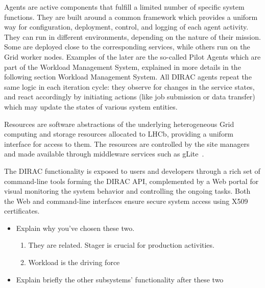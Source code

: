 \documentclass{IEEEtran}
\begin{document}
Agents are active components that fulfill a limited number of specific
system functions. They are built around a common framework which provides
a uniform way for configuration, deployment, control, and logging of each
agent activity.  They can run in different environments, depending on the
nature of their mission. Some are deployed close to the corresponding
services, while others run on the Grid worker nodes.  Examples of the
later are the so-called Pilot Agents which are part of the Workload
Management System, explained in more details in the following section
Workload Management System. All DIRAC agents repeat the same logic in
each iteration cycle: they observe for changes in the service states,
and react accordingly by initiating actions (like job submission or data
transfer) which may update the states of various system entities.

Resources are software abstractions of the underlying heterogeneous
Grid computing and storage resources allocated to LHCb, providing a
uniform interface for access to them. The resources are controlled by
the site managers and made available through middleware services such
as gLite~\cite{XXX}.

The DIRAC functionality is exposed to users and developers through a
rich set of command-line tools forming the DIRAC API, complemented by a
Web portal for visual monitoring the system behavior and controlling the
ongoing tasks. Both the Web and command-line interfaces ensure secure
system access using X509 certificates.

\begin{itemize}
\item Explain why you’ve chosen these two. 
\begin{enumerate} 
\item They are related. Stager is crucial for production activities. 
\item Workload is the driving force
\end{enumerate}
\item Explain briefly the other subsystems’ functionality after these two
\end{itemize}



\end{document}
